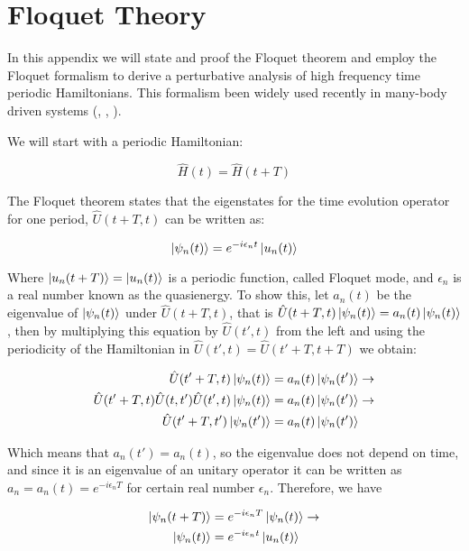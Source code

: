 \chapter{Floquet Theory}
\label{APE}
In this appendix we will state and proof the Floquet theorem and employ the Floquet formalism to derive a perturbative analysis of high frequency time periodic Hamiltonians. This formalism been widely used recently in many-body driven systems (\cite{Desbuquois2017}, \cite{Bordia2017}, \cite{Gorg2018}).

We will start with a periodic Hamiltonian:

\begin{equation}
\hat{H}(t) = \hat{H}(t+T)
\end{equation}

The Floquet theorem states that the eigenstates for the time evolution operator for one period, $\hat{U}(t+T,t)$ can be written as:

\begin{equation}
\ket{\psi_n(t)} = e^{-i \epsilon_n t}\ket{u_n(t)}
\end{equation}

Where $\ket{u_n(t+T)} = \ket{u_n(t)}$ is a periodic function, called Floquet mode, and $\epsilon_n$ is a real number known as the quasienergy. To show this, let $a_n(t)$ be the eigenvalue of $\ket{\psi_n(t)}$ under $\hat{U}(t+T,t)$, that is $\hat{U}(t+T,t)\ket{\psi_n(t)} = a_n(t)\ket{\psi_n(t)}$, then by multiplying this equation by $\hat{U}(t',t)$ from the left and using the periodicity of the Hamiltonian in $\hat{U}(t',t) = \hat{U}(t'+T,t+T)$ we obtain:

\begin{align*}
\hat{U}(t'+T,t) \ket{\psi_n(t)} &= a_n(t)\ket{\psi_n(t')} \rightarrow \\
\hat{U}(t'+T,t) \hat{U}(t,t')\hat{U}(t',t) \ket{\psi_n(t)} &= a_n(t)\ket{\psi_n(t')} \rightarrow \\
\hat{U}(t'+T,t') \ket{\psi_n(t')} &= a_n(t)\ket{\psi_n(t')}
\end{align*}

Which means that $a_n(t') = a_n(t)$, so the eigenvalue does not depend on time, and since it is an eigenvalue of an unitary operator it can be written as $a_n = a_n(t) = e^{-i\epsilon_nT}$ for certain real number $\epsilon_n$. Therefore, we have 

\begin{align*}
\ket{\psi_n(t+T)} &= e^{-i\epsilon_nT} \ket{\psi_n(t)} \rightarrow \\
\ket{\psi_n(t)} &= e^{-i\epsilon_nt} \ket{u_n(t)}
\end{align*}

